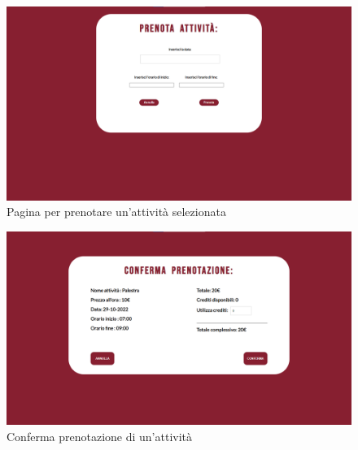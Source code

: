 \documentclass [a4paper, 12pt]{book}
\begin{document}
\begin{figure}[!h]
\centering
\includegraphics[scale=0.3]{PrenotaAttivita.png}
\caption{Pagina per prenotare un'attività selezionata}
\label{PrenotaAttivita}
\end{figure}
\begin{figure}[!h]
\centering
\includegraphics[scale=0.3]{ConfermaPrenotazioneAttivita.png}
\caption{Conferma prenotazione di un'attività}
\label{ConfermaPrenotazioneAttivita}
\end{figure}\newpage
\end{document}
